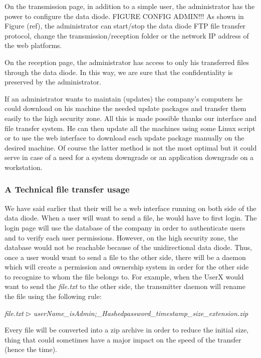 \documentclass[a4paper,10pt]{article}
\begin{document}
On the transmission page, in addition to a simple user, the administrator has the power to configure the data diode. FIGURE CONFIG ADMIN!!! As shown in Figure (ref), the administrator can start/stop the data diode FTP file transfer protocol, change the transmission/reception folder or the network IP address of the web platforms. 

On the reception page, the administrator has access to only his transferred files through the data diode. In this way, we are sure that the confidentiality is preserved by the administrator.  

If an administrator wants to maintain (updates) the company's computers he could download on his machine the needed update packages and transfer them easily to the high security zone. All this is made possible thanks our interface and file transfer system. He can then update all the machines using some Linux script or to use the web interface to download each update package manually on the desired machine. Of course the latter method is not the most optimal but it could serve in case of a need for a system downgrade or an application downgrade on a workstation. 


\subsubsection{A Technical file transfer usage}
We have said earlier that their will be a web interface running on both side of the data diode. When a user will want to send a file, he would have to first login. The login page will use the database of the company in order to authenticate users and to verify each user permissions. However, on the high security zone, the database would not be reachable because of the unidirectional data diode. Thus, once a user would want to send a file to the other side, there will be a daemon which will create a permission and ownership system in order for the other side to recognize to whom the file belongs to. For example, when the UserX would want to send the \emph{file.txt} to the other side, the transmitter daemon will rename the file using the following rule:
\begin{center}
\centering
\emph{file.txt} $\triangleright$ \emph{userName\_isAdmin;\_Hashedpassword\_timestamp\_size\_extension.zip}
\end{center} 

Every file will be converted into a zip archive in order to reduce the initial size, thing that could sometimes have a major impact on the speed of the transfer (hence the time).\bigskip
\end{document}
